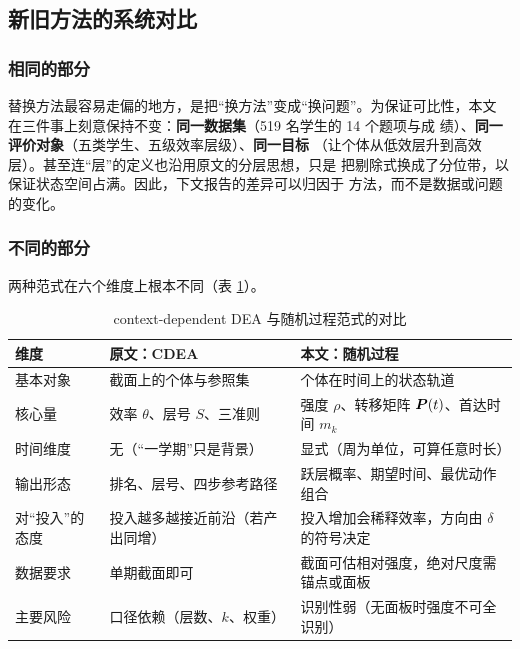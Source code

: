 \subsection{新旧方法的系统对比}

\subsubsection{相同的部分}

替换方法最容易走偏的地方，是把“换方法”变成“换问题”。为保证可比性，本文
在三件事上刻意保持不变：\textbf{同一数据集}（519 名学生的 14 个题项与成
绩）、\textbf{同一评价对象}（五类学生、五级效率层级）、\textbf{同一目标}
（让个体从低效层升到高效层）。甚至连“层”的定义也沿用原文的分层思想，只是
把剔除式换成了分位带，以保证状态空间占满。因此，下文报告的差异可以归因于
方法，而不是数据或问题的变化。

\subsubsection{不同的部分}

两种范式在六个维度上根本不同（表 \ref{tab:compare}）。

\begin{table}[htbp]
\centering
\tabfont
\caption{context-dependent DEA 与随机过程范式的对比}
\label{tab:compare}
\begin{tabularx}{\textwidth}{@{}p{2.9cm}p{4.2cm}X@{}}
\toprule
维度 & 原文：CDEA & 本文：随机过程 \\
\midrule
基本对象 & 截面上的个体与参照集 &
  个体在时间上的状态轨道 \\
核心量 & 效率 $\theta$、层号 $S$、三准则 &
  强度 $\rho$、转移矩阵 $\bm{P}(t)$、首达时间 $m_k$ \\
时间维度 & 无（“一学期”只是背景） &
  显式（周为单位，可算任意时长） \\
输出形态 & 排名、层号、四步参考路径 &
  跃层概率、期望时间、最优动作组合 \\
对“投入”的态度 & 投入越多越接近前沿（若产出同增） &
  投入增加会稀释效率，方向由 $\delta$ 的符号决定 \\
数据要求 & 单期截面即可 &
  截面可估相对强度，绝对尺度需锚点或面板 \\
主要风险 & 口径依赖（层数、$k$、权重） &
  识别性弱（无面板时强度不可全识别） \\
\bottomrule
\end{tabularx}
\end{table}

